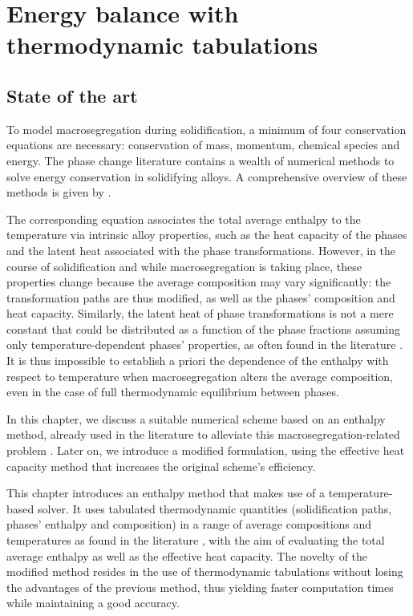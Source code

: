 \chapter{Energy balance with thermodynamic tabulations}
\begin{nolinkcolors} 
\minitoc
\end{nolinkcolors}
\newpage
%
%
\section{State of the art}
To model macrosegregation during solidification, a minimum of four conservation equations are necessary:
conservation  of  mass, momentum,  chemical  species and  energy. The  phase  change
literature  contains a  wealth of numerical methods to solve energy conservation
in solidifying alloys. A comprehensive overview of these methods is given by \citet{swaminathan._enthalpy_1993}.

The corresponding equation associates the total average enthalpy to the
temperature  via  intrinsic  alloy  properties, such  as the heat  capacity of  the
phases and the latent  heat associated with the phase transformations. However, in the course
of solidification and while macrosegregation is taking place, these  properties change because the average
composition may  vary  significantly: the  transformation paths are thus modified, as well as
the phases' composition and heat capacity. Similarly, the latent heat of phase  transformations
is not a mere constant that could be distributed as a function of the phase fractions
assuming only temperature-dependent phases' properties, as often found in the literature \citep{bellet_call_2009}.
It is thus impossible to establish a priori the dependence of the enthalpy with respect
to temperature when macrosegregation alters the average composition, even in the case of full thermodynamic equilibrium
between phases. 

In this chapter, we discuss a suitable numerical scheme based on an enthalpy method,
already used in the literature  to  alleviate this macrosegregation-related problem \citep{swaminathan._enthalpy_1993,
carozzani_direct_2013}. Later on, we introduce a modified formulation, using the effective heat capacity method that 
increases the original scheme's efficiency. 

This chapter introduces an enthalpy method that makes use of a temperature-based solver. 
It uses tabulated thermodynamic quantities (solidification paths, phases' enthalpy  and composition) 
in a range of average compositions and temperatures as found in the literature 
\citep{dore_modelling_2000,thuinet_prediction_2004,du_modeling_2007}, 
with the aim of evaluating the total average enthalpy as well as the effective heat capacity. 
The novelty of the modified method resides in the use of thermodynamic tabulations without losing 
the advantages of the previous method, thus yielding faster computation times while maintaining a 
good accuracy.


